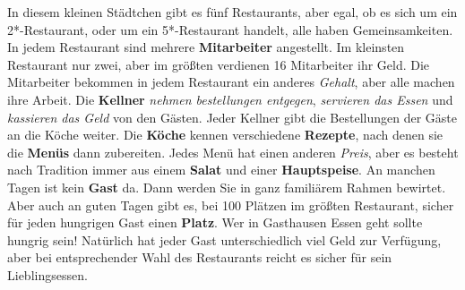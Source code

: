 \documentclass{lehramt-informatik}
\begin{document}
\begin{enumerate}
In diesem kleinen Städtchen gibt es fünf Restaurants, aber egal, ob es
sich um ein 2*-Restaurant, oder um ein 5*-Restaurant handelt, alle haben
Gemeinsamkeiten. In jedem Restaurant sind mehrere \textbf{Mitarbeiter}
angestellt. Im kleinsten Restaurant nur zwei, aber im größten verdienen
16 Mitarbeiter ihr Geld. Die Mitarbeiter bekommen in jedem Restaurant
ein anderes \emph{Gehalt}, aber alle machen ihre Arbeit. Die
\textbf{Kellner}
\emph{nehmen bestellungen entgegen}, \emph{servieren das Essen} und \emph{kassieren das Geld}
von den Gästen. Jeder Kellner gibt die Bestellungen der Gäste an die
Köche weiter. Die \textbf{Köche} kennen verschiedene \textbf{Rezepte},
nach denen sie die \textbf{Menüs} dann zubereiten. Jedes Menü hat einen
anderen \emph{Preis}, aber es besteht nach Tradition immer aus einem
\textbf{Salat} und einer \textbf{Hauptspeise}. An manchen Tagen ist kein
\textbf{Gast} da. Dann werden Sie in ganz familiärem Rahmen bewirtet.
Aber auch an guten Tagen gibt es, bei 100 Plätzen im größten Restaurant,
sicher für jeden hungrigen Gast einen \textbf{Platz}. Wer in Gasthausen
Essen geht sollte hungrig sein! Natürlich hat jeder Gast unterschiedlich
viel Geld zur Verfügung, aber bei entsprechender Wahl des Restaurants
reicht es sicher für sein Lieblingsessen.


\end{enumerate}
\end{document}

